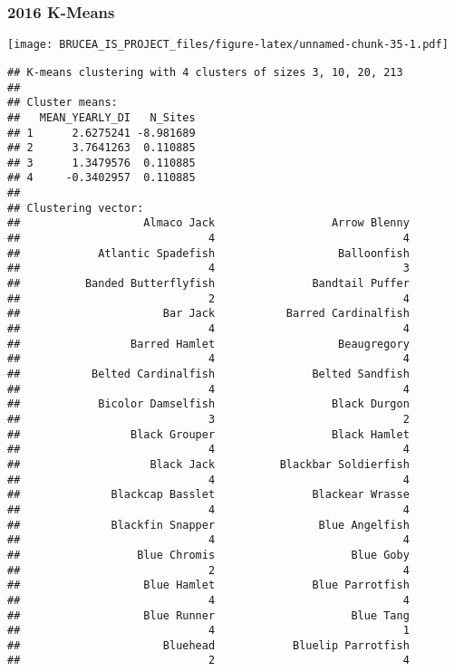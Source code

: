 \documentclass[
]{article}
\begin{document}
\hypertarget{k-means-9}{%
\subsubsection{2016 K-Means}\label{k-means-9}}

\texttt{[image: BRUCEA\_IS\_PROJECT\_files/figure-latex/unnamed-chunk-35-1.pdf]}

\begin{verbatim}
## K-means clustering with 4 clusters of sizes 3, 10, 20, 213
## 
## Cluster means:
##   MEAN_YEARLY_DI   N_Sites
## 1      2.6275241 -8.981689
## 2      3.7641263  0.110885
## 3      1.3479576  0.110885
## 4     -0.3402957  0.110885
## 
## Clustering vector:
##                   Almaco Jack                  Arrow Blenny 
##                             4                             4 
##            Atlantic Spadefish                   Balloonfish 
##                             4                             3 
##          Banded Butterflyfish               Bandtail Puffer 
##                             2                             4 
##                      Bar Jack           Barred Cardinalfish 
##                             4                             4 
##                 Barred Hamlet                   Beaugregory 
##                             4                             4 
##           Belted Cardinalfish               Belted Sandfish 
##                             4                             4 
##            Bicolor Damselfish                  Black Durgon 
##                             3                             2 
##                 Black Grouper                  Black Hamlet 
##                             4                             4 
##                    Black Jack          Blackbar Soldierfish 
##                             4                             4 
##              Blackcap Basslet               Blackear Wrasse 
##                             4                             4 
##              Blackfin Snapper                Blue Angelfish 
##                             4                             4 
##                  Blue Chromis                     Blue Goby 
##                             2                             4 
##                   Blue Hamlet               Blue Parrotfish 
##                             4                             4 
##                   Blue Runner                     Blue Tang 
##                             4                             1 
##                      Bluehead            Bluelip Parrotfish 
##                             2                             4 

\end{verbatim}
\end{document}
